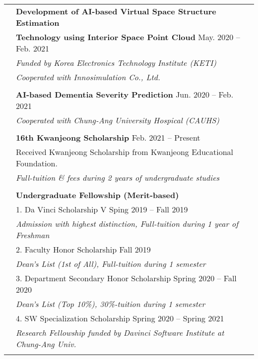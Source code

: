 \documentclass[letterpaper, 11pt]{article}
\begin{document}
\begin{longtable}{p{1.3in}p{4.8in}}
& {\textbf{Development of AI-based Virtual Space Structure Estimation}} \\
& {\textbf{Technology using Interior Space Point Cloud}} \hfill May. 2020 -- Feb. 2021 \\
& {\it Funded by Korea Electronics Technology Institute (KETI)} \\
& {\it Cooperated with Innosimulation Co., Ltd. } \\
& \\
 
& {\textbf{AI-based Dementia Severity Prediction}} \hfill Jun. 2020 -- Feb. 2021 \\
& {\it Cooperated with Chung-Ang University Hospical (CAUHS)}  \\
& \\


{\color{OliveGreen}{Honors and }} 
& \textbf{16th Kwanjeong Scholarship} \hfill Feb. 2021 -- Present \\
{\color{OliveGreen}{Scholarship}} 
& Received Kwanjeong Scholarship from Kwanjeong Educational Foundation. \\
& {\it Full-tuition \& fees during 2 years of undergraduate studies} \\
\\

& \textbf{Undergraduate Fellowship (Merit-based)} \\
& \setlength{\leftskip}{10pt} 1. Da Vinci Scholarship V \hfill Sping 2019 -- Fall 2019\\
& \setlength{\leftskip}{10pt} {\it Admission with highest distinction, Full-tuition during 1 year of Freshman} \\
& \setlength{\leftskip}{10pt} 2. Faculty Honor Scholarship \hfill Fall 2019 \\
& \setlength{\leftskip}{10pt} {\it Dean's List (1st of All), Full-tuition during 1 semester} \\
& \setlength{\leftskip}{10pt} 3. Department Secondary Honor Scholarship \hfill Spring 2020 -- Fall 2020\\
& \setlength{\leftskip}{10pt} {\it Dean's List (Top 10\%), 30\%-tuition during 1 semester} \\
& \setlength{\leftskip}{10pt} 4. SW Specialization Scholarship \hfill Spring 2020 -- Spring 2021\\
& \setlength{\leftskip}{10pt} {\it Research Fellowship funded by Davinci Software Institute at Chung-Ang Univ.} \\
\\


\end{longtable}
\end{document}
